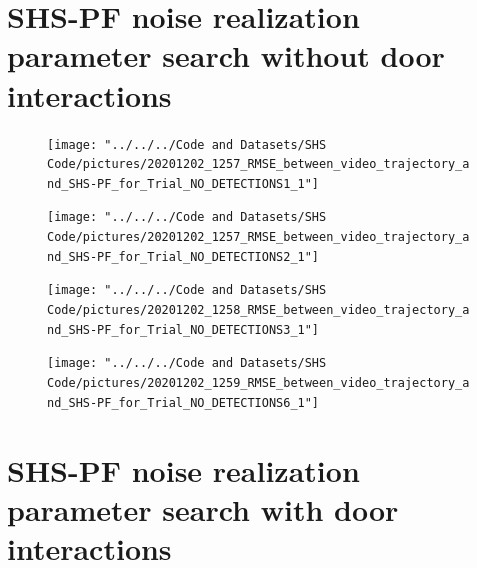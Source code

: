 \section{SHS-PF noise realization parameter search \textbf{without} door interactions}
\label{sec:app-shs_pf_noise_realization_no_detection}
\begin{figure}[H]
	\centering
	\texttt{[image: "../../../Code and Datasets/SHS Code/pictures/20201202\_1257\_RMSE\_between\_video\_trajectory\_and\_SHS-PF\_for\_Trial\_NO\_DETECTIONS1\_1"]}
	\setlength{\belowcaptionskip}{-20pt}
	\caption{}
	\label{fig:202012021257rmsebetweenvideotrajectoryandshs-pffortrialnodetections11}
\end{figure}
\begin{figure}[H]
	\centering
	\texttt{[image: "../../../Code and Datasets/SHS Code/pictures/20201202\_1257\_RMSE\_between\_video\_trajectory\_and\_SHS-PF\_for\_Trial\_NO\_DETECTIONS2\_1"]}
	\setlength{\belowcaptionskip}{-20pt}
	\caption{}
	\label{fig:202012021257rmsebetweenvideotrajectoryandshs-pffortrialnodetections21}
\end{figure}
\begin{figure}[H]
	\centering
	\texttt{[image: "../../../Code and Datasets/SHS Code/pictures/20201202\_1258\_RMSE\_between\_video\_trajectory\_and\_SHS-PF\_for\_Trial\_NO\_DETECTIONS3\_1"]}
	\setlength{\belowcaptionskip}{-20pt}
	\caption{}
	\label{fig:202012021258rmsebetweenvideotrajectoryandshs-pffortrialnodetections31}
\end{figure}
\begin{figure}[H]
	\centering
	\texttt{[image: "../../../Code and Datasets/SHS Code/pictures/20201202\_1259\_RMSE\_between\_video\_trajectory\_and\_SHS-PF\_for\_Trial\_NO\_DETECTIONS6\_1"]}
	\setlength{\belowcaptionskip}{-20pt}
	\caption{}
	\label{fig:202012021259rmsebetweenvideotrajectoryandshs-pffortrialnodetections61}
\end{figure}



\section{SHS-PF noise realization parameter search \textbf{with} door interactions}
\label{sec:app-shs_pf_noise_realization}


